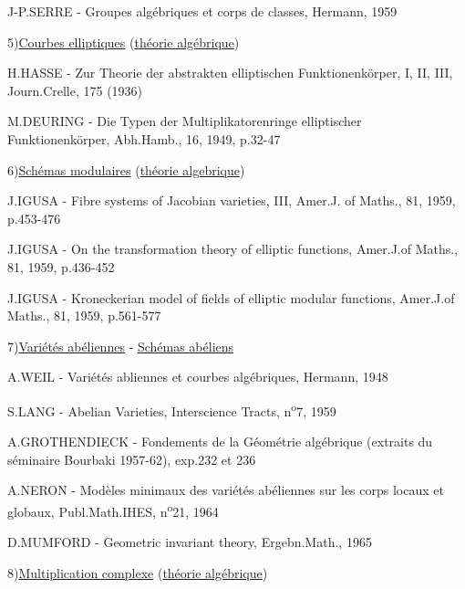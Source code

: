 J-P.SERRE - Groupes algébriques et corps de classes, Hermann, 1959

5)\quad \uline{Courbes elliptiques} (\uline{théorie algébrique})

H.HASSE - Zur Theorie der abstrakten elliptischen Funktionenkörper, I, II, III, Journ.Crelle, 175 (1936)

M.DEURING - Die Typen der Multiplikatorenringe elliptischer Funktionenkörper, Abh.Hamb., 16, 1949, p.32-47

6)\quad \uline{Schémas modulaires} (\uline{théorie algebrique})

J.IGUSA - Fibre systems of Jacobian varieties, III, Amer.J. of Maths., 81, 1959, p.453-476

J.IGUSA - On the transformation theory of elliptic functions, Amer.J.of Maths., 81, 1959, p.436-452

J.IGUSA - Kroneckerian model of fields of elliptic modular functions, Amer.J.of Maths., 81, 1959, p.561-577

7)\quad \uline{Variétés abéliennes} - \uline{Schémas abéliens}

A.WEIL - Variétés abliennes et courbes algébriques, Hermann, 1948

S.LANG - Abelian Varieties, Interscience Tracts, n\textsuperscript{o}7, 1959

A.GROTHENDIECK - Fondements de la Géométrie algébrique (extraits du séminaire Bourbaki 1957-62), exp.232 et 236

A.NERON - Modèles minimaux des variétés abéliennes sur les corps locaux et globaux, Publ.Math.IHES, n\textsuperscript{o}21, 1964

D.MUMFORD - Geometric invariant theory, Ergebn.Math., 1965
\normalmarginpar
\clearpage
{}
\reversemarginpar
{}
\normalmarginpar
{}

8)\quad \uline{Multiplication complexe} (\uline{théorie algébrique})

